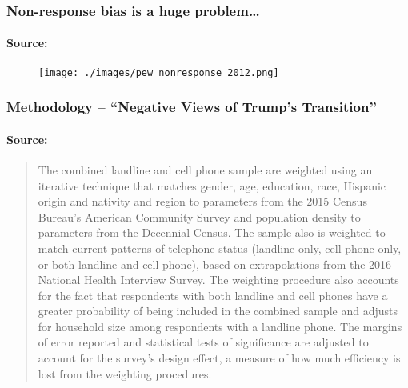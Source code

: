 \begin{frame}
  \frametitle{Non-response bias is a huge problem\dots}
  \framesubtitle{Source: \href{http://www.people-press.org/2012/05/15/assessing-the-representativeness-of-public-opinion-surveys}{}}

  \begin{figure}
    \centering
\texttt{[image: ./images/pew\_nonresponse\_2012.png]}
\end{figure}

\end{frame}
\begin{frame}
  \frametitle{Methodology -- ``Negative Views of Trump's Transition''}
  \framesubtitle{Source: \href{http://www.people-press.org/2017/01/10/negative-views-of-trumps-transition-amid-concerns-about-conflicts-tax-returns/2/}{}}
  \begin{quote}
    \footnotesize
    The combined landline and cell phone sample are \alert{weighted using an iterative technique that matches gender, age, education, race, Hispanic origin and nativity and region to parameters from the 2015 Census Bureau’s American Community Survey} and population density to parameters from the Decennial Census. The sample also is weighted to match current patterns of telephone status (landline only, cell phone only, or both landline and cell phone), based on extrapolations from the 2016 National Health Interview Survey. The weighting procedure also accounts for the fact that respondents with both landline and cell phones have a greater probability of being included in the combined sample and adjusts for household size among respondents with a landline phone. The margins of error reported and statistical tests of significance are adjusted to account for the survey’s design effect, a measure of how much efficiency is lost from the weighting procedures.
  \end{quote}
\end{frame}
